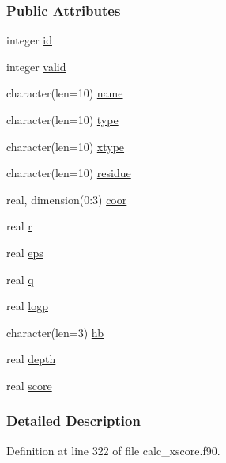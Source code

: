\subsubsection*{Public Attributes}
\begin{DoxyCompactItemize}
\item 
integer \hyperlink{structcalc__xscore_1_1txwater_a97ff68e4d1414e0113cf3355b7b8f2d4}{id}
\item 
integer \hyperlink{structcalc__xscore_1_1txwater_ac05a7c8bee5c381ef5d47281b92a1344}{valid}
\item 
character(len=10) \hyperlink{structcalc__xscore_1_1txwater_a4a6c959d358f4d21ab1aea77b9ec8edd}{name}
\item 
character(len=10) \hyperlink{structcalc__xscore_1_1txwater_a057e100854a627834189ea3b519cd309}{type}
\item 
character(len=10) \hyperlink{structcalc__xscore_1_1txwater_a1dfeb15097110cc40e3df3e528601119}{xtype}
\item 
character(len=10) \hyperlink{structcalc__xscore_1_1txwater_ad8f5a046d443c8f1acd26f78f23c0684}{residue}
\item 
real, dimension(0\-:3) \hyperlink{structcalc__xscore_1_1txwater_a5656c062071d4991624590bc26dca59a}{coor}
\item 
real \hyperlink{structcalc__xscore_1_1txwater_a3df282d5e86e22834d440fe62220ab96}{r}
\item 
real \hyperlink{structcalc__xscore_1_1txwater_a96942ebf92f985949f9c7fafe1213228}{eps}
\item 
real \hyperlink{structcalc__xscore_1_1txwater_a0fc4d5652e7f2ccd36c935f14638ae08}{q}
\item 
real \hyperlink{structcalc__xscore_1_1txwater_aaaea5df5eb83bdf62adf6f74a454fdf6}{logp}
\item 
character(len=3) \hyperlink{structcalc__xscore_1_1txwater_a3b924dafc12f54d1d849131337403ded}{hb}
\item 
real \hyperlink{structcalc__xscore_1_1txwater_a73da2224f62044ec6ed75b62bad3a4ea}{depth}
\item 
real \hyperlink{structcalc__xscore_1_1txwater_a4eb1dc1bb8449e5e81e5f1f1571a2063}{score}
\end{DoxyCompactItemize}


\subsubsection{Detailed Description}


Definition at line 322 of file calc\-\_\-xscore.\-f90.



